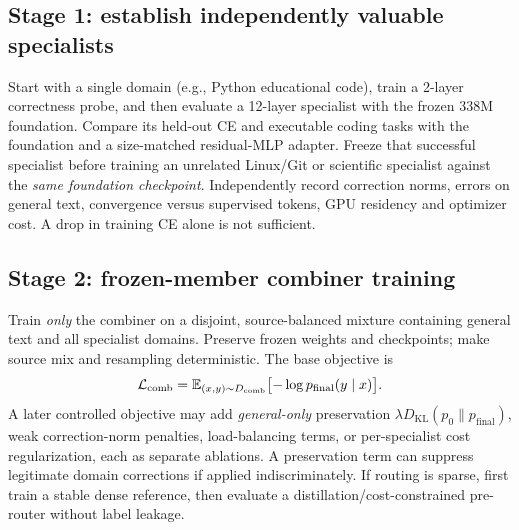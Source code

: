 \documentclass[11pt,letterpaper]{article}
\newcommand{\KL}{D_{\mathrm{KL}}}
\begin{document}
\subsection{Stage 1: establish independently valuable specialists}
Start with a single domain (e.g., Python educational code), train a 2-layer correctness probe, and then evaluate a 12-layer specialist with the frozen 338M foundation. Compare its held-out CE and executable coding tasks with the foundation and a size-matched residual-MLP adapter. Freeze that successful specialist before training an unrelated Linux/Git or scientific specialist against the \emph{same foundation checkpoint}. Independently record correction norms, errors on general text, convergence versus supervised tokens, GPU residency and optimizer cost. A drop in training CE alone is not sufficient.

\subsection{Stage 2: frozen-member combiner training}
Train \emph{only} the combiner on a disjoint, source-balanced mixture containing general text and all specialist domains. Preserve frozen weights and checkpoints; make source mix and resampling deterministic. The base objective is
\begin{equation}
 \mathcal L_{\mathrm{comb}}=\mathbb E_{(x,y)\sim D_{\rm comb}}
 \bigl[-\log p_{\mathrm{final}}(y\mid x)\bigr].
 \label{eq:ce}
\end{equation}
A later controlled objective may add \emph{general-only} preservation $\lambda\KL(p_0\|p_{\mathrm{final}})$, weak correction-norm penalties, load-balancing terms, or per-specialist cost regularization, each as separate ablations. A preservation term can suppress legitimate domain corrections if applied indiscriminately. If routing is sparse, first train a stable dense reference, then evaluate a distillation/cost-constrained pre-router without label leakage.
\end{document}
